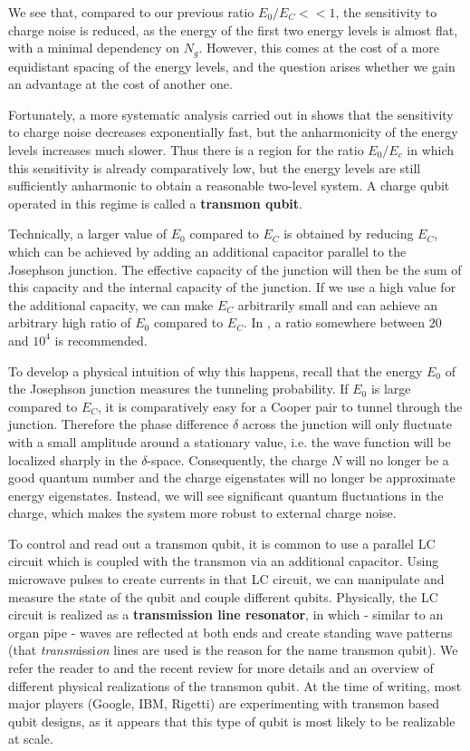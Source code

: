 \documentclass[a4paper, draft]{article}
\theoremstyle{own}
\theoremstyle{remark}
\begin{document}
We see that, compared to our previous ratio $E_0 / E_C << 1$, the sensitivity to charge noise is reduced, as the energy of the first two energy levels is almost flat, with a minimal dependency on $N_g$. However, this comes at the cost of a more equidistant spacing of the energy levels, and the question arises whether we gain an advantage at the cost of another one.

Fortunately, a more systematic analysis carried out in \cite{KochEtAl} shows that the sensitivity to charge noise decreases exponentially fast, but the anharmonicity of the energy levels increases much slower. Thus there is a region for the ratio $E_0 / E_c$ in which this sensitivity is already comparatively low, but the energy levels are still sufficiently anharmonic to obtain a reasonable two-level system. A charge qubit operated in this regime is called a {\bf transmon qubit}.

Technically, a larger value of $E_0$ compared to $E_C$ is obtained by reducing $E_C$, which can be achieved by adding an additional capacitor parallel to the Josephson junction. The effective capacity of the junction will then be the sum of this capacity and the internal capacity of the junction. If we use a high value for the additional capacity, we can make $E_C$ arbitrarily small and can achieve an arbitrary high ratio of $E_0$ compared to $E_C$. In \cite{KochEtAl}, a ratio somewhere between $20$ and $10^4$ is recommended.

To develop a physical intuition of why this happens, recall that the energy $E_0$ of the Josephson junction measures the tunneling probability. If $E_0$ is large compared to $E_C$, it is comparatively easy for a Cooper pair to tunnel through the junction. Therefore the phase difference $\delta$ across the junction will only fluctuate with a small amplitude around a stationary value, i.e. the wave function will be localized sharply in the $\delta$-space. Consequently, the charge $N$ will no longer be a good quantum number and the charge eigenstates will no longer be approximate energy eigenstates. Instead, we will see significant quantum fluctuations in the charge, which makes the system more robust to external charge noise. 

To control and read out a transmon qubit, it is common to use a parallel LC circuit which is coupled with the transmon via an additional capacitor. Using microwave pulses to create currents in that LC circuit, we can manipulate and measure the state of the qubit and couple different qubits. Physically, the LC circuit is realized as a {\bf transmission line resonator}, in which - similar to an organ pipe - waves are reflected at both ends and create standing wave patterns (that {\it transm}issi{\it on} lines are used is the reason for the name transmon qubit). We refer the reader to \cite{KochEtAl} and the recent review \cite{Wendin2016} for more details and an overview of different physical realizations of the transmon qubit. At the time of writing, most major players (Google, IBM, Rigetti) are experimenting with transmon based qubit designs, as it appears that this type of qubit is most likely to be realizable at scale.
\end{document}
